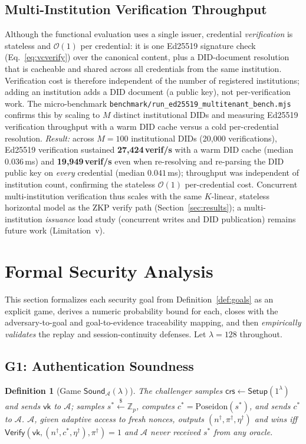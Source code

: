 \documentclass[journal,twoside,10pt]{IEEEtran}
\newtheorem{definition}{Definition}
\begin{document}
\subsection{Multi-Institution Verification Throughput}
\label{sec:multi_inst}
Although the functional evaluation uses a single issuer, credential
\emph{verification} is stateless and $\mathcal{O}(1)$ per credential: it is
one Ed25519 signature check (Eq.~\ref{eq:vcverify}) over the canonical
content, plus a DID-document resolution that is cacheable and shared across
all credentials from the same institution. Verification cost is therefore
independent of the number of registered institutions; adding an institution
adds a DID document (a public key), not per-verification work. The
micro-benchmark
\texttt{benchmark/\allowbreak run\_ed25519\_\allowbreak multitenant\_bench.mjs}
confirms this by scaling to $M$ distinct institutional DIDs and measuring
Ed25519 verification throughput with a warm DID cache versus a cold
per-credential resolution. \emph{Result:} across $M{=}100$ institutional
DIDs (20{,}000 verifications), Ed25519 verification sustained
\textbf{27{,}424\,verif/s} with a warm DID cache (median $0.036$\,ms) and
\textbf{19{,}949\,verif/s} even when re-resolving and re-parsing the DID
public key on \emph{every} credential (median $0.041$\,ms); throughput was
independent of institution count, confirming the stateless $\mathcal{O}(1)$
per-credential cost. Concurrent multi-institution
verification thus scales with the same $K$-linear, stateless horizontal
model as the ZKP verify path (Section~\ref{sec:results}); a
multi-institution \emph{issuance} load study (concurrent writes and DID
publication) remains future work (Limitation~v).

\section{Formal Security Analysis}
\label{sec:security}
This section formalizes each security goal from Definition~\ref{def:goals}
as an explicit game, derives a numeric probability bound for each, closes
with the adversary-to-goal and goal-to-evidence traceability mapping, and
then \emph{empirically validates} the replay and session-continuity
defenses. Let $\lambda=128$ throughout.

\subsection{G1: Authentication Soundness}
\begin{definition}[Game $\mathsf{Sound}_{\mathcal{A}}(\lambda)$]
The challenger samples $\mathsf{crs}\leftarrow\mathsf{Setup}(1^\lambda)$
and sends $\mathsf{vk}$ to $\mathcal{A}$; samples $s^*\xleftarrow{\$}\mathbb{Z}_p$,
computes $c^*=\mathrm{Poseidon}(s^*)$, and sends $c^*$ to $\mathcal{A}$.
$\mathcal{A}$, given adaptive access to fresh nonces, outputs
$(n^\dagger,\pi^\dagger,\eta^\dagger)$ and wins iff
$\mathsf{Verify}(\mathsf{vk},(n^\dagger,c^*,\eta^\dagger),\pi^\dagger)=1$ and
$\mathcal{A}$ never received $s^*$ from any oracle.
\end{definition}
\end{document}

